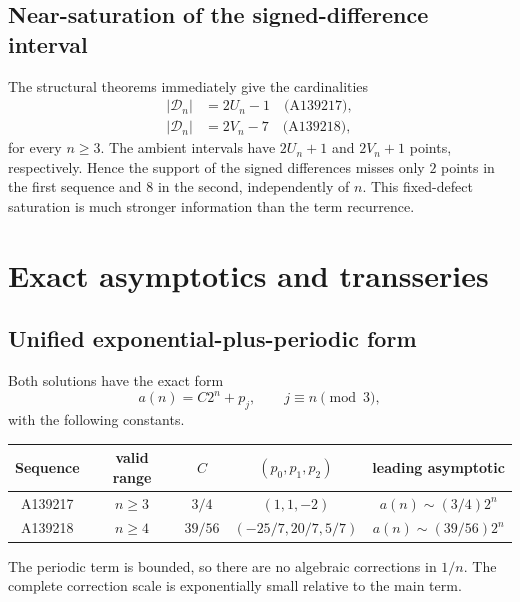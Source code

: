 \documentclass[11pt,a4paper]{article}
\numberwithin{equation}{section}
\theoremstyle{definition}
\theoremstyle{remark}
\theoremstyle{plain}
\newcommand{\cD}{\mathcal D}
\begin{document}
\subsection{Near-saturation of the signed-difference interval}

The structural theorems immediately give the cardinalities
\begin{align}
 |\cD_n|&=2U_n-1\quad\text{(A139217)},\label{gdf:eq:u-delta-size}\\
 |\cD_n|&=2V_n-7\quad\text{(A139218)},\label{gdf:eq:v-delta-size}
\end{align}
for every $n\ge3$.  The ambient intervals have $2U_n+1$ and $2V_n+1$ points,
respectively.  Hence the support of the signed differences misses only $2$
points in the first sequence and $8$ in the second, independently of $n$.
This fixed-defect saturation is much stronger information than the term
recurrence.

\section{Exact asymptotics and transseries}\label{gdf:sec:asymptotics}

\subsection{Unified exponential-plus-periodic form}\label{gdf:sec:unified}

Both solutions have the exact form
\begin{equation}\label{gdf:eq:unified-form}
 a(n)=C2^n+p_j,\qquad j\equiv n\pmod3,
\end{equation}
with the following constants.

\begin{center}
\begin{tabular}{ccccc}
\toprule
Sequence & valid range & $C$ & $(p_0,p_1,p_2)$ & leading asymptotic\\
\midrule
A139217 & $n\ge3$ & $3/4$ & $(1,1,-2)$ & $a(n)\sim(3/4)2^n$\\
A139218 & $n\ge4$ & $39/56$ & $(-25/7,20/7,5/7)$ & $a(n)\sim(39/56)2^n$\\
\bottomrule
\end{tabular}
\end{center}

The periodic term is bounded, so there are no algebraic corrections in
$1/n$.  The complete correction scale is exponentially small relative to the
main term.
\end{document}
